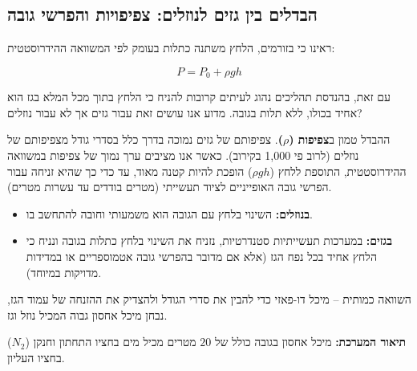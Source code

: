 \documentclass[
  hebrew,
  letterpaper,
  DIV=11,
  numbers=noendperiod]{scrreprt}
\providecommand{\tightlist}{%
  \setlength{\itemsep}{0pt}\setlength{\parskip}{0pt}}
\begin{document}
\subsection{\texorpdfstring{{הבדלים בין גזים לנוזלים: צפיפויות והפרשי
גובה}}{הבדלים בין גזים לנוזלים: צפיפויות והפרשי גובה}}\label{ux5d4ux5d1ux5d3ux5dcux5d9ux5dd-ux5d1ux5d9ux5df-ux5d2ux5d6ux5d9ux5dd-ux5dcux5e0ux5d5ux5d6ux5dcux5d9ux5dd-ux5e6ux5e4ux5d9ux5e4ux5d5ux5d9ux5d5ux5ea-ux5d5ux5d4ux5e4ux5e8ux5e9ux5d9-ux5d2ux5d5ux5d1ux5d4}

ראינו כי בזורמים, הלחץ משתנה כתלות בעומק לפי המשוואה ההידרוסטטית:

\[P = P_0 + \rho g h\]

עם זאת, בהנדסת תהליכים נהוג לעיתים קרובות להניח כי הלחץ בתוך מכל המלא
בגז הוא אחיד בכולו, ללא תלות בגובה. מדוע אנו עושים זאת עבור גזים אך לא
עבור נוזלים?

ההבדל טמון ב\textbf{צפיפות (\(\rho\))}. צפיפותם של גזים נמוכה בדרך כלל
בסדרי גודל מצפיפותם של נוזלים (לרוב פי 1,000 בקירוב). כאשר אנו מציבים
ערך נמוך של צפיפות במשוואה ההידרוסטטית, התוספת ללחץ (\(\rho g h\)) הופכת
להיות קטנה מאוד, עד כדי כך שהיא זניחה עבור הפרשי גובה האופייניים לציוד
תעשייתי (מטרים בודדים עד עשרות מטרים).

\begin{tcolorbox}[enhanced jigsaw, colback=white, arc=.35mm, coltitle=black, breakable, toptitle=1mm, leftrule=.75mm, colbacktitle=quarto-callout-tip-color!10!white, opacitybacktitle=0.6, bottomtitle=1mm, titlerule=0mm, opacityback=0, colframe=quarto-callout-tip-color-frame, title=\textcolor{quarto-callout-tip-color}{\faLightbulb}\hspace{0.5em}{כלל אצבע הנדסי}, rightrule=.15mm, bottomrule=.15mm, toprule=.15mm, left=2mm]

\begin{itemize}
\tightlist
\item
  \textbf{בנוזלים:} השינוי בלחץ עם הגובה הוא משמעותי וחובה להתחשב בו.
\item
  \textbf{בגזים:} במערכות תעשייתיות סטנדרטיות, נזניח את השינוי בלחץ
  כתלות בגובה ונניח כי הלחץ אחיד בכל נפח הגז (אלא אם מדובר בהפרשי גובה
  אטמוספריים או במדידות מדויקות במיוחד).
\end{itemize}

\end{tcolorbox}

השוואה כמותית -- מיכל דו-פאזי כדי להבין את סדרי הגודל ולהצדיק את ההזנחה
של עמוד הגז, נבחן מיכל אחסון גבוה המכיל נוזל וגז.

\textbf{תיאור המערכת:} מיכל אחסון בגובה כולל של \(20\) מטרים מכיל מים
בחציו התחתון וחנקן (\(N_2\)) בחציו העליון.
\end{document}
